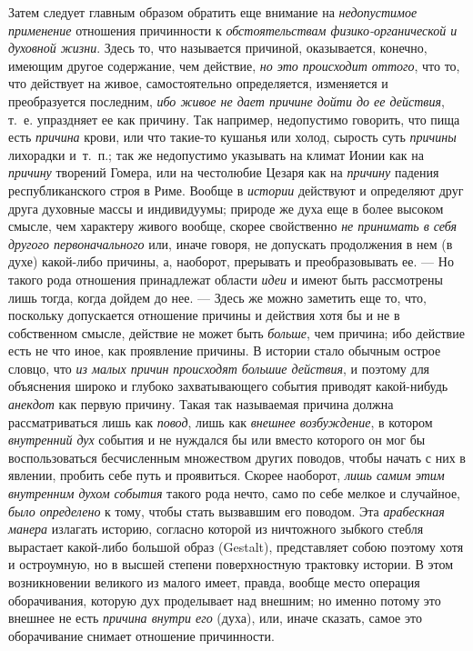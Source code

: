 Затем следует главным образом обратить еще внимание на
{\em недопустимое применение} отношения причинности к
{\em обстоятельствам физико-органической и духовной
жизни}. Здесь то, что называется причиной, оказывается, конечно, имеющим
другое содержание, чем действие, {\em но это происходит
оттого}, что то, что действует на живое, самостоятельно определяется,
изменяется и преобразуется последним, {\em ибо живое не
дает причине дойти до ее действия}, т.~е. упраздняет ее как причину. Так
например, недопустимо говорить, что пища есть
{\em причина} крови, или что такие-то кушанья или
холод, сырость суть {\em причины} лихорадки и~т.~п.;
так же недопустимо указывать на климат Ионии как на
{\em причину} творений Гомера, или на честолюбие Цезаря
как на {\em причину} падения республиканского строя в
Риме. Вообще в {\em истории} действуют и определяют
друг друга духовные массы и индивидуумы; природе же духа еще в более
высоком смысле, чем характеру живого вообще, скорее свойственно
{\em не принимать в себя другого первоначального} или,
иначе говоря, не допускать продолжения в нем (в духе) какой-либо причины,
а, наоборот, прерывать и преобразовывать ее. — Но такого рода отношения
принадлежат области {\em идеи} и имеют быть рассмотрены
лишь тогда, когда дойдем до нее. — Здесь же можно заметить еще то, что,
поскольку допускается отношение причины и действия хотя бы и не в
собственном смысле, действие не может быть
{\em больше}, чем причина; ибо действие есть не что
иное, как проявление причины. В истории стало обычным острое словцо, что
{\em из малых причин происходят большие действия}, и
поэтому для объяснения широко и глубоко захватывающего события приводят
какой-нибудь {\em анекдот} как первую причину. Такая
так называемая причина должна рассматриваться лишь как
{\em повод}, лишь как {\em внешнее
возбуждение}, в котором {\em внутренний дух} события и
не нуждался бы или вместо которого он мог бы воспользоваться бесчисленным
множеством других поводов, чтобы начать с них в явлении, пробить себе путь
и проявиться. Скорее наоборот, {\em лишь самим этим
внутренним духом события} такого рода нечто, само по себе мелкое и
случайное, {\em было определено} к тому, чтобы стать
вызвавшим его поводом. Эта {\em арабескная манера}
излагать историю, согласно которой из ничтожного зыбкого стебля вырастает
какой-либо большой образ (Gestalt), представляет собою поэтому хотя и
остроумную, но в высшей степени поверхностную трактовку истории. В этом
возникновении великого из малого имеет, правда, вообще место операция
оборачивания, которую дух проделывает над внешним; но именно потому это
внешнее не есть {\em причина внутри его} (духа), или,
иначе сказать, самое это оборачивание снимает отношение причинности.

